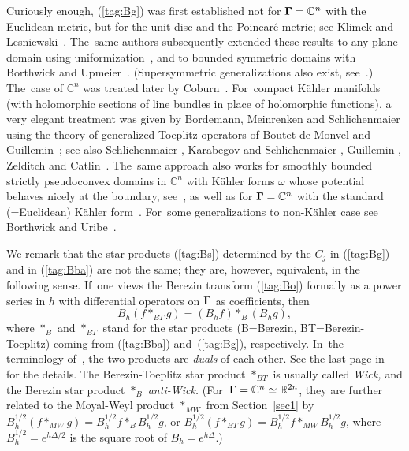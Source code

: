 \documentclass[12pt]{amsart}
\numberwithin{equation}{section}
\theoremstyle{remark}
\newcommand\Omg{{\bigam}}   %
\newcommand\RR{\mathbb R}
\newcommand{\CC}{\C}
\newcommand{\bigam}{\mbox{\boldmath $\Gamma$}}
\newcommand{\C}{\mathbb C}
\begin{document}
Curiously enough, (\ref{tag:Bg}) was first established not for $\Omg=\CC^n$
with the Euclidean metric, but for the unit disc and the Poincar\'e metric; see
Klimek and Lesniewski~\cite{bib:KLa}. The~same authors subsequently extended
these results to any plane domain using uniformization~\cite{bib:KLb}, and to
bounded symmetric domains with Borthwick and Upmeier~\cite{bib:BLU}.
(Supersymmetric generalizations also exist, see~\cite{bib:BLUR}.) The~case of
$\CC^n$ was treated later by Coburn~\cite{bib:Cob}. For~compact K\"ahler
manifolds (with holomorphic sections of line bundles in place of holomorphic
functions), a very elegant treatment was given by Bordemann, Meinrenken and
Schlichenmaier \cite{bib:BMS} using the theory of generalized Toeplitz
operators of Boutet de Monvel and Guillemin~\cite{bib:BdMG}; see also
Schlichenmaier \cite{bib:Schli} \cite{bib:SchliM}, Karabegov and Schlichenmaier
\cite{bib:KaSchli}, Guillemin \cite{bib:Guill}, Zelditch \cite{bib:Zeld} and
Catlin~\cite{bib:Tian}. The~same approach also works for smoothly bounded
strictly pseudoconvex domains in $\CC^n$ with K\"ahler forms $\omega$ whose
potential behaves nicely at the boundary, see~\cite{bib:ESI}, as well as for
$\Omg=\CC^n$ with the standard (=Euclidean) K\"ahler form~\cite{bib:Borthw}.
For~some generalizations to non-K\"ahler case see Borthwick and
Uribe~\cite{bib:BU}.

We remark that the star products (\ref{tag:Bs}) determined by the $C_j$ in
(\ref{tag:Bg}) and in (\ref{tag:Bba}) are not the same; they are, however,
equivalent, in the following sense. If~one views the Berezin transform
(\ref{tag:Bo}) formally as a power series in $h$ with differential operators on
$\Omg$ as coefficients, then
$$ B_h( f*_{BT} g) = (B_h f) *_B (B_h g) , $$
where $*_B$ and $*_{BT}$ stand for the star products (B=Berezin,
BT=Berezin-Toeplitz) coming from (\ref{tag:Bba}) and~(\ref{tag:Bg}),
respectively. In~the terminology of~\cite{bib:KarA}, the two products are
{\it duals\/} of each other. See the last page in~\cite{bib:ESI} for the
details. The Berezin-Toeplitz star product $*_{BT}$ is usually called
{\it Wick,\/} and the Berezin star product $*_B$ {\it anti-Wick.\/}
(For~$\Omg=\CC^n\simeq\RR^{2n}$, they are further related to the Moyal-Weyl
product $*_{MW}$ from Section~\ref{sec1} by $B_h^{1/2}(f*_{MW}g)=B_h^{1/2}f
*_B B_h^{1/2}g$, or $B_h^{1/2}(f*_{BT}g)=B_h^{1/2}f*_{MW} B_h^{1/2}g$, where
$B_h^{1/2}=e^{h\Delta/2}$ is the square root of $B_h=e^{h\Delta}$.)
\end{document}
